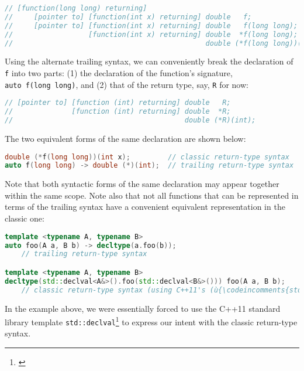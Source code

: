 \begin{lstlisting}[language=C++]
// [function(long long) returning]
//     [pointer to] [function(int x) returning] double   f;
//     [pointer to] [function(int x) returning] double   f(long long);
//                  [function(int x) returning] double  *f(long long);
//                                              double (*f(long long))(int x);
\end{lstlisting}
    
\noindent Using the alternate trailing syntax, we can conveniently break the
declaration of \lstinline!f! into two parts: (1) the declaration of the
function's signature, \lstinline!auto!~\lstinline!f(long!~\lstinline!long)!, and (2) that of the return type, say, \lstinline!R! for now:

\begin{lstlisting}[language=C++]
// [pointer to] [function (int) returning] double   R;
//              [function (int) returning] double  *R;
//                                         double (*R)(int);
\end{lstlisting}
    
\noindent The two equivalent forms of the same declaration are shown below:

\begin{lstlisting}[language=C++]
double (*f(long long))(int x);         // classic return-type syntax
auto f(long long) -> double (*)(int);  // trailing return-type syntax
\end{lstlisting}
    
\noindent Note that both syntactic forms of the same declaration may appear
together within the same scope. Note also that not all functions that
can be represented in terms of the trailing syntax have a convenient
equivalent representation in the classic one:

\begin{lstlisting}[language=C++]
template <typename A, typename B>
auto foo(A a, B b) -> decltype(a.foo(b));
    // trailing return-type syntax

template <typename A, typename B>
decltype(std::declval<A&>().foo(std::declval<B&>())) foo(A a, B b);
    // classic return-type syntax (using C++11's (ù{\codeincomments{std::declval}}ù))
\end{lstlisting}
    
\noindent In the example above, we were essentially forced to use the C++11
standard library template \lstinline!std::declval!\footnote{\cite{cpprefdeclval}} to express our intent with the classic
return-type syntax.

